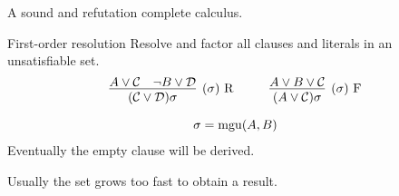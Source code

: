 
	\begin{goal}
		A sound and refutation complete calculus.
	\end{goal}
	
	\begin{block}{First-order resolution}
		Resolve and factor all clauses and literals in an unsatisfiable set. 
		\begin{gather*}
			\infer
			[(\sigma)\text{ R}]
			{(\mcC \lor \mcD)\sigma}
			{{A} \lor\mcC & {\lnot B} \lor\mcD}
			\hspace{1cm}
			\infer
			[(\sigma)\text{ F}]
			{(A \lor \mcC)\sigma}
			{{A}\lor B\lor\mcC} \\[0.7em]
			\sigma = \mgu(A,B)
		\end{gather*}
		Eventually the empty clause will be derived.
	\end{block}
	
	\begin{observation}
		Usually the set grows too fast to obtain a result.
	\end{observation}
